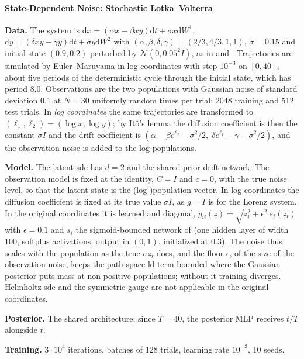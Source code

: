 \documentclass{article} %
\newcommand{\vol}{g}
\newcommand{\diff}{{\mathrm{d}}}
\newcommand{\Norm}{\mathcal{N}}
\begin{document}
\paragraph{State-Dependent Noise: Stochastic Lotka--Volterra}
\textbf{Data.} The system is $\diff x = (\alpha x - \beta x y) \diff t + \sigma x \diff W^1$, $\diff y = (\delta x y - \gamma y) \diff t + \sigma y \diff W^2$ with $(\alpha, \beta, \delta, \gamma) = (2/3, 4/3, 1, 1)$, $\sigma = 0.15$ and initial state $(0.9, 0.2)$ perturbed by $\Norm(0, 0.05^2 I)$, as in \citet{course2023amortized} and \citet{bartosh2025sde}. Trajectories are simulated by Euler--Maruyama in log coordinates with step $10^{-3}$ on $[0, 40]$, about five periods of the deterministic cycle through the initial state, which has period $8.0$. Observations are the two populations with Gaussian noise of standard deviation $0.1$ at $N = 30$ uniformly random times per trial; 2048 training and 512 test trials. In \emph{log coordinates} the same trajectories are transformed to $(\ell_1, \ell_2) = (\log x, \log y)$; by It\^o's lemma the diffusion coefficient is then the constant $\sigma I$ and the drift coefficient is $(\alpha - \beta e^{\ell_2} - \sigma^2/2, \; \delta e^{\ell_1} - \gamma - \sigma^2/2)$, and the observation noise is added to the log-populations.

\textbf{Model.} The latent \gls{sde} has $d = 2$ and the shared prior drift network. The observation model is fixed at the identity, $C = I$ and $c = 0$, with the true noise level, so that the latent state is the (log-)population vector. In log coordinates the diffusion coefficient is fixed at its true value $\sigma I$, as $\vol = I$ is for the Lorenz system. In the original coordinates it is learned and diagonal, $\vol_{ii}(z) = \sqrt{z_i^2 + \epsilon^2} \, s_i(z_i)$ with $\epsilon = 0.1$ and $s_i$ the sigmoid-bounded network of \citet{bartosh2025sde} (one hidden layer of width 100, softplus activations, output in $(0, 1)$, initialized at $0.3$). The noise thus scales with the population as the true $\sigma z_i$ does, and the floor $\epsilon$, of the size of the observation noise, keeps the path-space \gls{kl} term bounded where the Gaussian posterior puts mass at non-positive populations; without it training diverges. Helmholtz-\gls{sde} and the symmetric gauge are not applicable in the original coordinates.

\textbf{Posterior.} The shared architecture; since $T = 40$, the posterior MLP receives $t / T$ alongside $t$.

\textbf{Training.} $3 \cdot 10^4$ iterations, batches of 128 trials, learning rate $10^{-3}$, 10 seeds.
\end{document}
